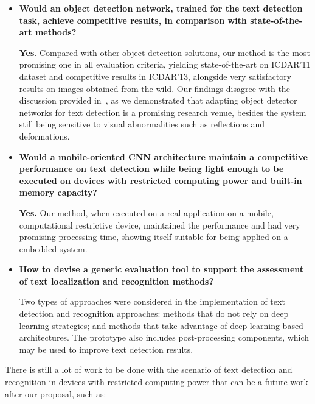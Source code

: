 \begin{itemize}
    \item \textbf{Would an object detection network, trained for the text detection task, achieve competitive results, in comparison with state-of-the-art methods?}
    
    \textbf{Yes}. Compared with other object detection solutions, our method is the most promising one in all evaluation criteria, yielding state-of-the-art on ICDAR'11 dataset and competitive results in ICDAR'13, alongside very satisfactory results on images obtained from the wild. Our findings disagree with the discussion provided in~\cite{Ye2015PAMI}, as we demonstrated that adapting object detector networks for text detection is a promising research venue, besides the system still being sensitive to visual abnormalities such as reflections and deformations.
    
    \item \textbf{Would a mobile-oriented CNN architecture maintain a competitive performance on text detection while being light enough to be executed on devices with restricted computing power and built-in memory capacity?}
    
    \textbf{Yes.} Our method, when executed on a real application on a mobile, computational restrictive device, maintained the performance and had very promising processing time, showing itself suitable for being applied on a embedded system. 
    
    \item \textbf{How to devise a generic evaluation tool to support the assessment of text localization and recognition methods?}
    
     Two types of approaches were considered in the implementation of text detection and recognition approaches: methods that do not rely on deep learning strategies; and methods that take advantage of deep learning-based architectures. The prototype also includes post-processing components, which may be used to improve text detection results.
    
    
\end{itemize}

There is still a lot of work to be done with the scenario of text detection and recognition in devices with restricted computing power that can be a future work after our proposal, such as:

